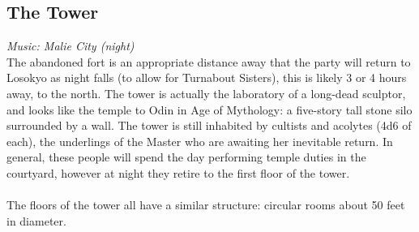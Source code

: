 \subsection{The Tower}
\textit{Music: Malie City (night)}\\
The abandoned fort is an appropriate distance away that the party will return to Losokyo as night falls (to allow for Turnabout Sisters), this is likely 3 or 4 hours away, to the north. The tower is actually the laboratory of a long-dead sculptor, and looks like the temple to Odin in Age of Mythology: a five-story tall stone silo surrounded by a wall. The tower is still inhabited by cultists and acolytes (4d6 of each), the underlings of the Master who are awaiting her inevitable return. In general, these people will spend the day performing temple duties in the courtyard, however at night they retire to the first floor of the tower.\\
\\
The floors of the tower all have a similar structure: circular rooms about 50 feet in diameter.
